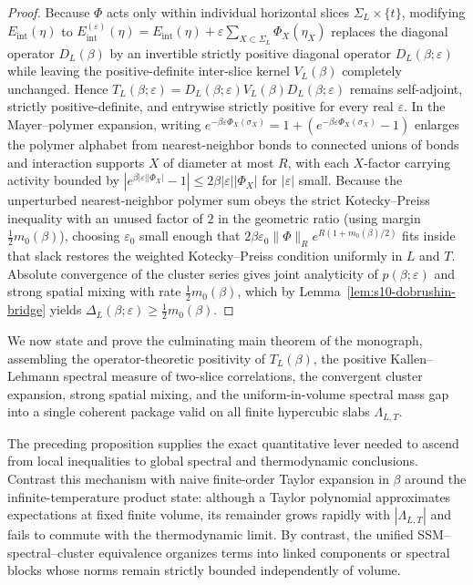 \documentclass[11pt]{article}
\theoremstyle{definition}
\begin{document}
\begin{proof}
Because $\Phi$ acts only within individual horizontal slices $\Sigma_L \times
\{t\}$, modifying $E_{\mathrm{int}}(\eta)$ to
$E_{\mathrm{int}}^{(\varepsilon)}(\eta) = E_{\mathrm{int}}(\eta) + \varepsilon
\sum_{X \subset \Sigma_L} \Phi_X(\eta_X)$ replaces the diagonal operator
$D_L(\beta)$ by an invertible strictly positive diagonal operator $D_L(\beta;
\varepsilon)$ while leaving the positive-definite inter-slice kernel $V_L(\beta)$
completely unchanged. Hence $T_L(\beta; \varepsilon) = D_L(\beta; \varepsilon)
V_L(\beta) D_L(\beta; \varepsilon)$ remains self-adjoint, strictly
positive-definite, and entrywise strictly positive for every real $\varepsilon$. In
the Mayer--polymer expansion, writing $e^{-\beta \varepsilon \Phi_X(\sigma_X)} = 1 +
(e^{-\beta \varepsilon \Phi_X(\sigma_X)} - 1)$ enlarges the polymer alphabet from
nearest-neighbor bonds to connected unions of bonds and interaction supports $X$ of
diameter at most $R$, with each $X$-factor carrying activity bounded by $|e^{\beta
|\varepsilon| |\Phi_X|} - 1| \le 2 \beta |\varepsilon| |\Phi_X|$ for $|\varepsilon|$
small. Because the unperturbed nearest-neighbor polymer sum obeys the strict
Kotecky--Preiss inequality with an unused factor of $2$ in the geometric ratio
(using margin $\frac{1}{2} m_0(\beta)$), choosing $\varepsilon_0$ small enough that
$2 \beta \varepsilon_0 \|\Phi\|_R e^{R (1 + m_0(\beta)/2)}$ fits inside that slack
restores the weighted Kotecky--Preiss condition uniformly in $L$ and $T$. Absolute
convergence of the cluster series gives joint analyticity of $p(\beta; \varepsilon)$
and strong spatial mixing with rate $\frac{1}{2} m_0(\beta)$, which by
Lemma~\ref{lem:s10-dobrushin-bridge} yields $\Delta_L(\beta; \varepsilon) \ge
\frac{1}{2} m_0(\beta)$.
\end{proof}

We now state and prove the culminating main theorem of the monograph, assembling the
operator-theoretic positivity of $T_L(\beta)$, the positive Kallen--Lehmann spectral
measure of two-slice correlations, the convergent cluster expansion, strong spatial
mixing, and the uniform-in-volume spectral mass gap into a single coherent package
valid on all finite hypercubic slabs $\Lambda_{L,T}$.

The preceding proposition supplies the exact quantitative lever needed to ascend
from local inequalities to global spectral and thermodynamic conclusions. Contrast
this mechanism with naive finite-order Taylor expansion in $\beta$ around the
infinite-temperature product state: although a Taylor polynomial approximates
expectations at fixed finite volume, its remainder grows rapidly with
$|\Lambda_{L,T}|$ and fails to commute with the thermodynamic limit. By contrast,
the unified SSM--spectral--cluster equivalence organizes terms into linked
components or spectral blocks whose norms remain strictly bounded independently of
volume.
\end{document}
